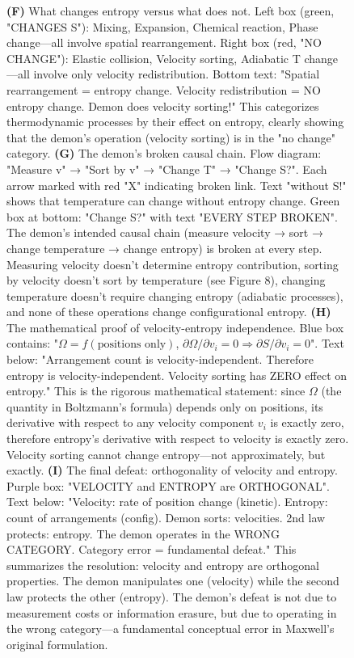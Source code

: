 \documentclass[12pt,a4paper]{article}
\theoremstyle{definition}
\theoremstyle{remark}
\begin{document}
\begin{figure}[htbp]
{\textbf{(F)} What changes entropy versus what does not. Left box (green, "CHANGES S"): Mixing, Expansion, Chemical reaction, Phase change—all involve spatial rearrangement. Right box (red, "NO CHANGE"): Elastic collision, Velocity sorting, Adiabatic T change—all involve only velocity redistribution. Bottom text: "Spatial rearrangement = entropy change. Velocity redistribution = NO entropy change. Demon does velocity sorting!" This categorizes thermodynamic processes by their effect on entropy, clearly showing that the demon's operation (velocity sorting) is in the "no change" category.
\textbf{(G)} The demon's broken causal chain. Flow diagram: "Measure v" → "Sort by v" → "Change T" → "Change S?". Each arrow marked with red "X" indicating broken link. Text "without S!" shows that temperature can change without entropy change. Green box at bottom: "Change S?" with text "EVERY STEP BROKEN". The demon's intended causal chain (measure velocity → sort → change temperature → change entropy) is broken at every step. Measuring velocity doesn't determine entropy contribution, sorting by velocity doesn't sort by temperature (see Figure 8), changing temperature doesn't require changing entropy (adiabatic processes), and none of these operations change configurational entropy.
\textbf{(H)} The mathematical proof of velocity-entropy independence. Blue box contains: "$\Omega = f(\text{positions only})$, $\partial \Omega/\partial v_i = 0 \Rightarrow \partial S/\partial v_i = 0$". Text below: "Arrangement count is velocity-independent. Therefore entropy is velocity-independent. Velocity sorting has ZERO effect on entropy." This is the rigorous mathematical statement: since $\Omega$ (the quantity in Boltzmann's formula) depends only on positions, its derivative with respect to any velocity component $v_i$ is exactly zero, therefore entropy's derivative with respect to velocity is exactly zero. Velocity sorting cannot change entropy—not approximately, but exactly.
\textbf{(I)} The final defeat: orthogonality of velocity and entropy. Purple box: "VELOCITY and ENTROPY are ORTHOGONAL". Text below: "Velocity: rate of position change (kinetic). Entropy: count of arrangements (config). Demon sorts: velocities. 2nd law protects: entropy. The demon operates in the WRONG CATEGORY. Category error = fundamental defeat." This summarizes the resolution: velocity and entropy are orthogonal properties. The demon manipulates one (velocity) while the second law protects the other (entropy). The demon's defeat is not due to measurement costs or information erasure, but due to operating in the wrong category—a fundamental conceptual error in Maxwell's original formulation.}
\label{fig:velocity_entropy_independence}
\end{figure}
\end{document}
